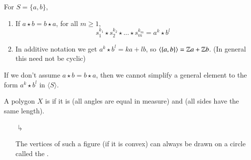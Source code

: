 \documentclass[12pt, a4paper, oneside, openright, titlepage]{book}
\begin{document}
\begin{eg}
    For $S = \{a,b\}$, \begin{enumerate}
        \item If $a \star b = b \star a$, for all $m \geq 1$, \begin{equation}
            s_1^{k_1}\star s_2^{k_2} \star ... \star s_m^{k_m} = a^k \star b^l
        \end{equation}
        \item In additive notation we get $a^k \star b^l = ka + lb$, so $\langle \{a,b\}\rangle = \mathbb Z a + \mathbb Z b$. (In general this need not be cyclic)
    \end{enumerate}
\end{eg}

\begin{rmk}
    If we don't assume $a \star b = b \star a$, then we cannot simplify a general element to the form $a^k \star b^l$ in $\langle S \rangle$.
\end{rmk}


\begin{defn}
    A polygon $X$ is  if it is  (all angles are equal in measure) and  (all sides have the same length).
\end{defn}
\begin{enumerate}
    \item[$\drsh$] \begin{note}
        The vertices of such a figure (if it is convex) can always be drawn on a circle called the .
    \end{note} 
\end{enumerate}
\end{document}
